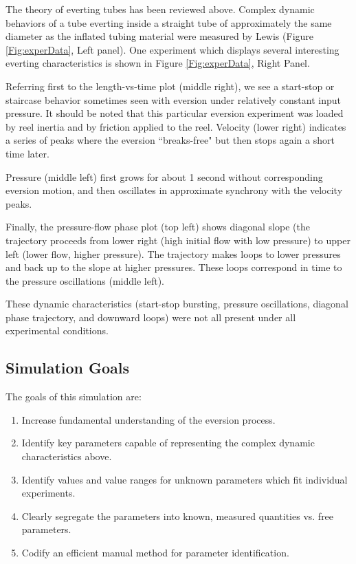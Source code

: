 \documentclass[letterpaper]{article}
\begin{document}
The theory of everting tubes has been reviewed above.   Complex dynamic behaviors of a tube everting
inside
a straight tube of approximately the same diameter as the inflated tubing material were measured
by Lewis \cite{xxxx} (Figure \ref{Fig:experData}, Left panel).   One experiment which displays several interesting everting characteristics
is shown in Figure \ref{Fig:experData}, Right Panel.

Referring first to the length-vs-time plot (middle right), we see a start-stop or staircase
behavior sometimes seen with eversion under relatively constant input pressure.   It
should be noted that this particular eversion experiment was loaded by reel inertia and
by friction applied to the reel.  Velocity (lower right) indicates a series of peaks where the eversion
``breaks-free" but then stops again a short time later.

Pressure (middle left) first grows for about 1 second without corresponding eversion motion, and
then oscillates in approximate synchrony with the velocity peaks.

Finally, the pressure-flow phase plot (top left) shows diagonal slope (the trajectory proceeds from
lower right (high initial flow with low pressure) to upper left (lower flow, higher pressure).
The trajectory makes loops to lower pressures and back up to the slope at higher pressures.  These
loops correspond in time to the pressure oscillations (middle left).

These dynamic characteristics (start-stop bursting, pressure oscillations, diagonal phase trajectory, and
downward loops) were not all present under all experimental conditions.

\subsection{Simulation Goals}
The goals of this simulation are:
\begin{enumerate}
  \item Increase fundamental understanding of the eversion process.
  \item Identify key parameters capable of representing the complex dynamic characteristics above.
  \item Identify values and value ranges for unknown parameters which fit individual experiments.
  \item Clearly segregate the parameters into known, measured quantities vs. free parameters.
  \item Codify an efficient manual method for parameter identification.
\end{enumerate}
\end{document}

